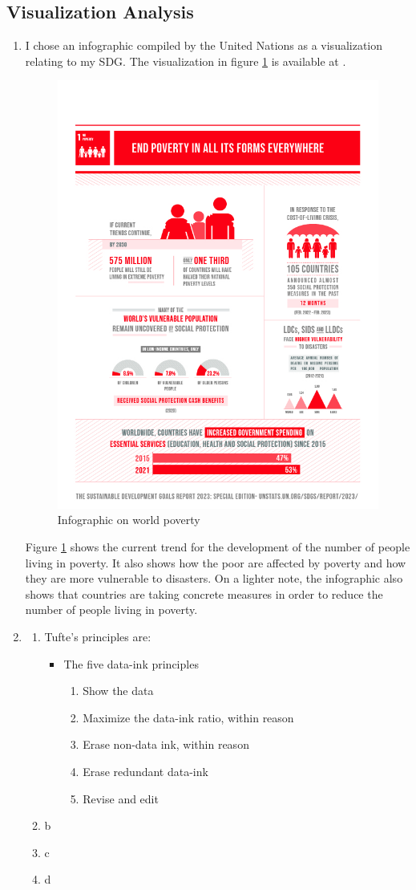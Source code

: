\documentclass[11pt,a4paper,titlepage]{article}
\begin{document}
\subsection{Visualization Analysis}
\begin{enumerate}
    \item I chose an infographic compiled by the United Nations as a visualization relating to my SDG. The visualization in figure \ref{fig:viz} is available at \cite{vizpov}.
    
    \begin{figure}[h]
        \centering
        \includegraphics[width=0.4\linewidth]{reports/assignment-1/imgs/task2.jpg}
        \caption{Infographic on world poverty}
        \label{fig:viz}
    \end{figure}

    Figure \ref{fig:viz} shows the current trend for the development of the number of people living in poverty. It also shows how the poor are affected by poverty and how they are more vulnerable to disasters. On a lighter note, the infographic also shows that countries are taking concrete measures in order to reduce the number of people living in poverty.
    
    \item \begin{enumerate}
        \item Tufte's principles are:
        \begin{itemize}
            \item The five data-ink principles
            \begin{enumerate}
                \item Show the data
                \item Maximize the data-ink ratio, within reason
                \item Erase non-data ink, within reason
                \item Erase redundant data-ink
                \item Revise and edit
            \end{enumerate}
        \end{itemize}
        \item b
        \item c
        \item d
    \end{enumerate}
    
\end{enumerate}
\end{document}

